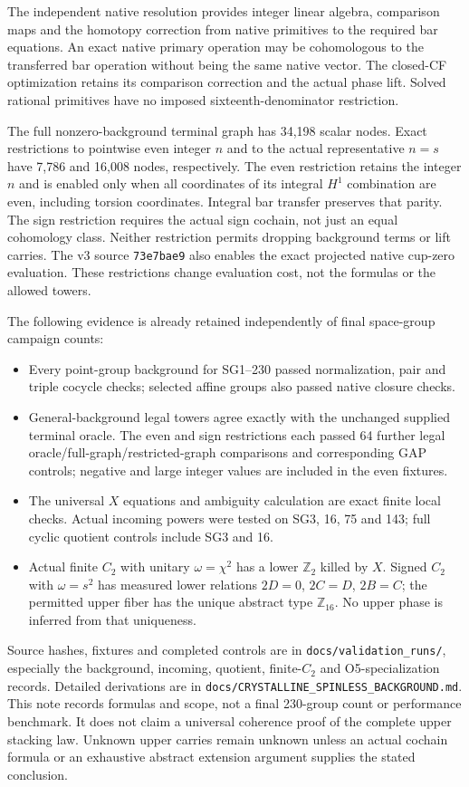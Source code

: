 \documentclass[11pt]{article}
\newcommand{\Z}{\mathbb Z}
\newcommand{\pathref}[1]{{\small\nolinkurl{#1}}}
\begin{document}
The independent native resolution provides integer linear algebra,
comparison maps and the homotopy correction from native primitives
to the required bar equations. An exact native primary operation may
be cohomologous to the transferred bar operation without being the
same native vector. The closed-CF optimization retains its comparison
correction and the actual phase lift. Solved rational primitives have
no imposed sixteenth-denominator restriction.

The full nonzero-background terminal graph has 34,198 scalar nodes.
Exact restrictions to pointwise even integer $n$ and to the actual
representative $n=s$ have 7,786 and 16,008 nodes, respectively. The
even restriction retains the integer $n$ and is enabled only when all
coordinates of its integral $H^1$ combination are even, including
torsion coordinates. Integral bar transfer preserves that parity.
The sign restriction requires the actual sign cochain, not just an
equal cohomology class. Neither restriction permits dropping background
terms or lift carries. The v3 source \pathref{73e7bae9} also enables
the exact projected native cup-zero evaluation. These restrictions
change evaluation cost, not the formulas or the allowed towers.

The following evidence is already retained independently of final
space-group campaign counts:
\begin{itemize}
 \item Every point-group background for SG1--230 passed normalization,
 pair and triple cocycle checks; selected affine groups also passed
 native closure checks.
 \item General-background legal towers agree exactly with the unchanged
 supplied terminal oracle. The even and sign restrictions each passed
 64 further legal oracle/full-graph/restricted-graph comparisons and
 corresponding GAP controls; negative and large integer values are
 included in the even fixtures.
 \item The universal $X$ equations and ambiguity calculation are exact
 finite local checks. Actual incoming powers were tested on SG3, 16,
 75 and 143; full cyclic quotient controls include SG3 and 16.
 \item Actual finite $C_2$ with unitary $\omega=\chi^2$ has a lower
 $\Z_2$ killed by $X$. Signed $C_2$ with $\omega=s^2$ has measured
 lower relations $2D=0$, $2C=D$, $2B=C$; the permitted upper fiber
 has the unique abstract type $\Z_{16}$. No upper phase is inferred
 from that uniqueness.
\end{itemize}
Source hashes, fixtures and completed controls are in
\pathref{docs/validation_runs/}, especially the background,
incoming, quotient, finite-$C_2$ and O5-specialization records.
Detailed derivations are in
\pathref{docs/CRYSTALLINE_SPINLESS_BACKGROUND.md}.
This note records formulas and scope, not a final 230-group count or
performance benchmark. It does not claim a universal coherence proof
of the complete upper stacking law. Unknown upper carries remain
unknown unless an actual cochain formula or an exhaustive abstract
extension argument supplies the stated conclusion.
\end{document}
